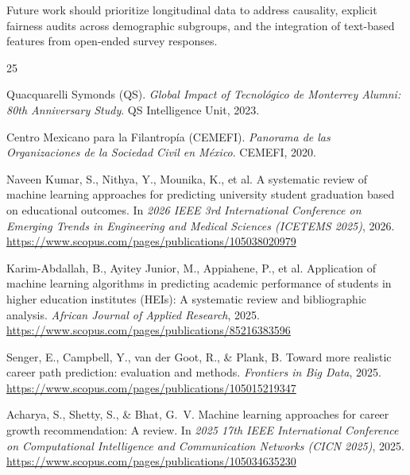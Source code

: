 \documentclass[10pt,twocolumn]{article}
\begin{document}
Future work should prioritize longitudinal data to address causality, explicit fairness audits across demographic subgroups, and the integration of text-based features from open-ended survey responses.


\begin{thebibliography}{25}

Quacquarelli Symonds (QS).
\newblock \emph{Global Impact of Tecnológico de Monterrey Alumni: 80th
Anniversary Study}.
\newblock QS Intelligence Unit, 2023.

Centro Mexicano para la Filantropía (CEMEFI).
\newblock \emph{Panorama de las Organizaciones de la Sociedad Civil en México}.
\newblock CEMEFI, 2020.

Naveen Kumar, S., Nithya, Y., Mounika, K., et al.
\newblock A systematic review of machine learning approaches for predicting
university student graduation based on educational outcomes.
\newblock In \emph{2026 IEEE 3rd International Conference on Emerging Trends in
Engineering and Medical Sciences (ICETEMS 2025)}, 2026.
\newblock \url{https://www.scopus.com/pages/publications/105038020979}

Karim-Abdallah, B., Ayitey Junior, M., Appiahene, P., et al.
\newblock Application of machine learning algorithms in predicting academic
performance of students in higher education institutes (HEIs): A systematic
review and bibliographic analysis.
\newblock \emph{African Journal of Applied Research}, 2025.
\newblock \url{https://www.scopus.com/pages/publications/85216383596}

Senger, E., Campbell, Y., van der Goot, R., \& Plank, B.
\newblock Toward more realistic career path prediction: evaluation and methods.
\newblock \emph{Frontiers in Big Data}, 2025.
\newblock \url{https://www.scopus.com/pages/publications/105015219347}

Acharya, S., Shetty, S., \& Bhat, G.\ V.
\newblock Machine learning approaches for career growth recommendation: A review.
\newblock In \emph{2025 17th IEEE International Conference on Computational
Intelligence and Communication Networks (CICN 2025)}, 2025.
\newblock \url{https://www.scopus.com/pages/publications/105034635230}


\end{thebibliography}
\end{document}
